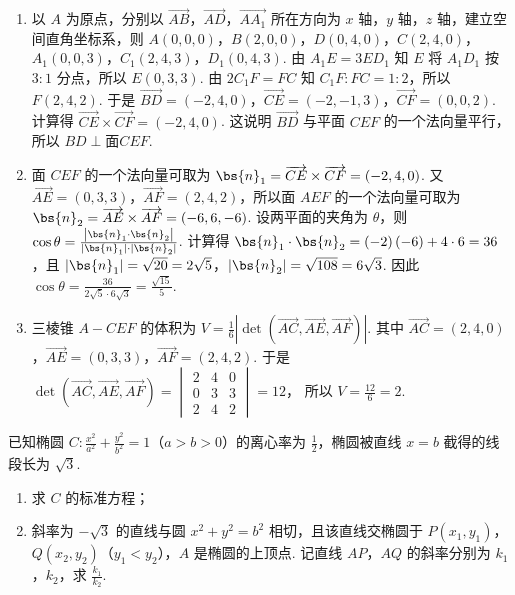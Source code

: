\documentclass[UTF8,a4paper,oneside,11pt]{ctexbook}
\begin{document}
\begin{solution}
\begin{enumerate}
\item 以 \(A\) 为原点，分别以 \(\overrightarrow{AB}\)，\(\overrightarrow{AD}\)，\(\overrightarrow{AA_1}\) 所在方向为 \(x\) 轴，\(y\) 轴，\(z\) 轴，建立空间直角坐标系，则 \(A(0,0,0)\)，\(B(2,0,0)\)，\(D(0,4,0)\)，\(C(2,4,0)\)，\(A_1(0,0,3)\)，\(C_1(2,4,3)\)，\(D_1(0,4,3)\).
由 \(A_1E=3ED_1\) 知 \(E\) 将 \(A_1D_1\) 按 \(3:1\) 分点，所以 \(E(0,3,3)\). 由 \(2C_1F=FC\) 知 \(C_1F:FC=1:2\)，所以 \(F(2,4,2)\).
于是 \(\overrightarrow{BD}=\left( -2,4,0 \right)\)，\(\overrightarrow{CE}=\left( -2,-1,3 \right)\)，\(\overrightarrow{CF}=\left( 0,0,2 \right)\). 计算得 \(\overrightarrow{CE}\times \overrightarrow{CF}=\left( -2,4,0 \right)\). 这说明 \(\overrightarrow{BD}\) 与平面 \(CEF\) 的一个法向量平行，所以 \(BD\perp \text{面} CEF\).

\item 面 \(CEF\) 的一个法向量可取为 \(\bs{n}_1=\overrightarrow{CE}\times \overrightarrow{CF}=\left( -2,4,0 \right)\).
又 \(\overrightarrow{AE}=\left( 0,3,3 \right)\)，\(\overrightarrow{AF}=\left( 2,4,2 \right)\)，所以面 \(AEF\) 的一个法向量可取为 \(\bs{n}_2=\overrightarrow{AE}\times \overrightarrow{AF}=\left( -6,6,-6 \right)\).
设两平面的夹角为 \(\theta\)，则 \(\cos \theta=\frac{\left| \bs{n}_1\cdot \bs{n}_2 \right|}{|\bs{n}_1|\cdot |\bs{n}_2|}\). 计算得 \(\bs{n}_1\cdot \bs{n}_2=\left( -2 \right)\left( -6 \right)+4\cdot 6=36\)，且 \(|\bs{n}_1|=\sqrt{20}=2\sqrt{5}\)，\(|\bs{n}_2|=\sqrt{108}=6\sqrt{3}\). 因此 \(\cos \theta=\frac{36}{2\sqrt{5}\cdot 6\sqrt{3}}=\frac{\sqrt{15}}{5}\).

\item 三棱锥 \(A-CEF\) 的体积为 \(V=\frac{1}{6}\left| \det \left( \overrightarrow{AC},\overrightarrow{AE},\overrightarrow{AF} \right) \right|\). 其中 \(\overrightarrow{AC}=\left( 2,4,0 \right)\)，\(\overrightarrow{AE}=\left( 0,3,3 \right)\)，\(\overrightarrow{AF}=\left( 2,4,2 \right)\). 于是
\(
\det \left( \overrightarrow{AC},\overrightarrow{AE},\overrightarrow{AF} \right)
=
\begin{vmatrix}
2&4&0\\
0&3&3\\
2&4&2
\end{vmatrix}
=12
\)，
所以 \(V=\frac{12}{6}=2\).
\end{enumerate}
\end{solution}

\begin{problem}
已知椭圆 \(C:\frac{x^2}{a^2}+\frac{y^2}{b^2}=1\)（\(a>b>0\)）的离心率为 \(\frac{1}{2}\)，椭圆被直线 \(x=b\) 截得的线段长为 \(\sqrt{3}\).

\begin{enumerate}
\item 求 \(C\) 的标准方程；
\item 斜率为 \(-\sqrt{3}\) 的直线与圆 \(x^2+y^2=b^2\) 相切，且该直线交椭圆于 \(P(x_1,y_1)\)，\(Q(x_2,y_2)\)（\(y_1<y_2\)），\(A\) 是椭圆的上顶点. 记直线 \(AP\)，\(AQ\) 的斜率分别为 \(k_1\)，\(k_2\)，求 \(\frac{k_1}{k_2}\).
\end{enumerate}
\end{problem}
\end{document}

